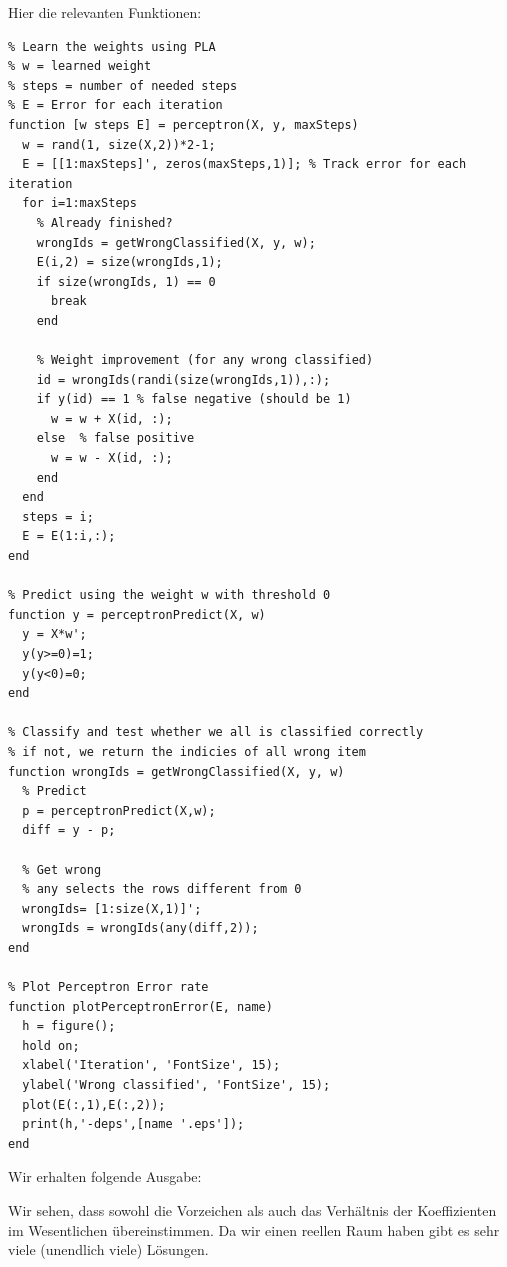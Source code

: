 \documentclass{article}
\begin{document}
	Hier die relevanten Funktionen:
	\begin{lstlisting}
% Learn the weights using PLA
% w = learned weight
% steps = number of needed steps
% E = Error for each iteration
function [w steps E] = perceptron(X, y, maxSteps)
  w = rand(1, size(X,2))*2-1;
  E = [[1:maxSteps]', zeros(maxSteps,1)]; % Track error for each iteration
  for i=1:maxSteps
    % Already finished?
    wrongIds = getWrongClassified(X, y, w);
    E(i,2) = size(wrongIds,1);
    if size(wrongIds, 1) == 0
      break
    end

    % Weight improvement (for any wrong classified)
    id = wrongIds(randi(size(wrongIds,1)),:);
    if y(id) == 1 % false negative (should be 1)
      w = w + X(id, :);
    else  % false positive
      w = w - X(id, :);
    end
  end
  steps = i;
  E = E(1:i,:);
end

% Predict using the weight w with threshold 0
function y = perceptronPredict(X, w)
  y = X*w';
  y(y>=0)=1;
  y(y<0)=0;
end

% Classify and test whether we all is classified correctly
% if not, we return the indicies of all wrong item
function wrongIds = getWrongClassified(X, y, w)
  % Predict
  p = perceptronPredict(X,w);
  diff = y - p;

  % Get wrong
  % any selects the rows different from 0
  wrongIds= [1:size(X,1)]';
  wrongIds = wrongIds(any(diff,2));
end

% Plot Perceptron Error rate
function plotPerceptronError(E, name)
  h = figure();
  hold on;
  xlabel('Iteration', 'FontSize', 15);
  ylabel('Wrong classified', 'FontSize', 15);
  plot(E(:,1),E(:,2));
  print(h,'-deps',[name '.eps']);
end
	\end{lstlisting}
	
	Wir erhalten folgende Ausgabe:
	
	Wir sehen, dass sowohl die Vorzeichen als auch das Verhältnis der Koeffizienten im Wesentlichen übereinstimmen. Da wir einen reellen Raum haben gibt es sehr viele (unendlich viele) Lösungen.\\
	
\end{document}
